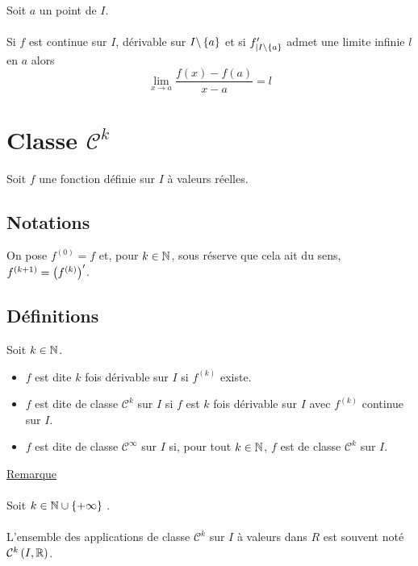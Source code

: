 \begin{defprop}
    Soit \(a\) un point de \(I\).\\~\\
    Si \(f\) est continue sur \(I\), dérivable sur \(I \backslash \left\lbrace a\right\rbrace\) et si \(f'_{|I\backslash\left\lbrace a\right\rbrace}\) admet une limite infinie \(l\) en \(a\) alors
    \[\lim _{x\to a} \frac{f (x) - f (a)}{ x - a} = l\]
\end{defprop}

\section{Classe \(\mathcal{C}^k\)}
Soit \(f\) une fonction définie sur \(I\) à valeurs réelles.
\subsection{Notations}
\begin{nota}
    On pose \(f ^{(0)} = f\) et, pour \(k \in \mathbb{N}\), sous réserve que cela ait du sens, \(f ^{(k+1)} = \left(f^{(k)}\right)' \).
\end{nota}

\subsection{Définitions}
\begin{defi}
    Soit \(k \in \mathbb{N}\).
    \begin{itemize}
        \item \(f\) est dite \(k\) fois dérivable sur \(I\) si \(f ^{(k)}\) existe.
        \item \(f\) est dite de classe \(\mathcal{C}^k\) sur \(I\) si \(f\) est \(k\) fois dérivable sur \(I\) avec \(f^{(k)}\) continue sur \(I\).
        \item \(f\) est dite de classe \(\mathcal{C}^{\infty}\) sur \(I\) si, pour tout \(k \in \mathbb{N}\), \(f\) est de classe \(\mathcal{C}^k\) sur \(I\).
    \end{itemize}
    \underline{Remarque}\\~\\
    Soit \(k \in \mathbb{N} \cup \left\lbrace+\infty\right\rbrace\) .\\~\\
    L’ensemble des applications de classe \(\mathcal{C}^k\) sur \(I\) à valeurs dans \(R\) est souvent noté \(\mathcal{C}^k\left(I,\mathbb{R}\right)\).
\end{defi}

